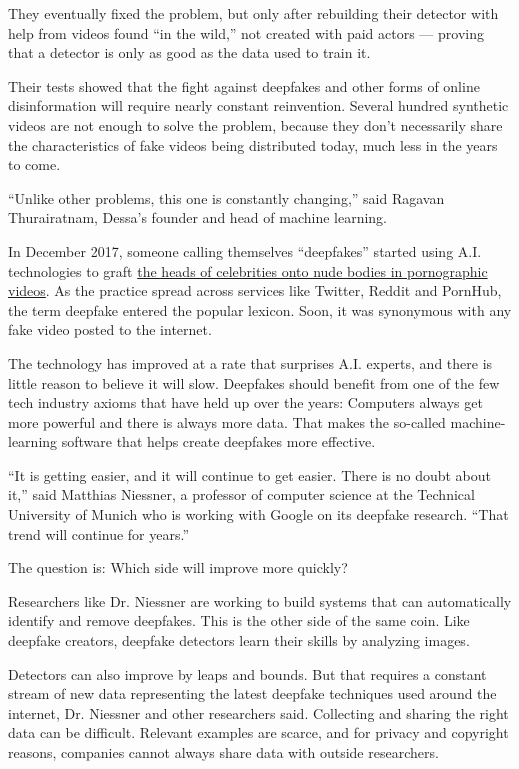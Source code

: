 They eventually fixed the problem, but only after rebuilding their
detector with help from videos found ``in the wild,'' not created with
paid actors --- proving that a detector is only as good as the data used
to train it.

Their tests showed that the fight against deepfakes and other forms of
online disinformation will require nearly constant reinvention. Several
hundred synthetic videos are not enough to solve the problem, because
they don't necessarily share the characteristics of fake videos being
distributed today, much less in the years to come.

``Unlike other problems, this one is constantly changing,'' said Ragavan
Thurairatnam, Dessa's founder and head of machine learning.

In December 2017, someone calling themselves ``deepfakes'' started using
A.I. technologies to graft
\href{https://www.nytimes.com/2018/03/04/technology/fake-videos-deepfakes.html}{the
heads of celebrities onto nude bodies in pornographic videos}. As the
practice spread across services like Twitter, Reddit and PornHub, the
term deepfake entered the popular lexicon. Soon, it was synonymous with
any fake video posted to the internet.

The technology has improved at a rate that surprises A.I. experts, and
there is little reason to believe it will slow. Deepfakes should benefit
from one of the few tech industry axioms that have held up over the
years: Computers always get more powerful and there is always more data.
That makes the so-called machine-learning software that helps create
deepfakes more effective.

``It is getting easier, and it will continue to get easier. There is no
doubt about it,'' said Matthias Niessner, a professor of computer
science at the Technical University of Munich who is working with Google
on its deepfake research. ``That trend will continue for years.''

The question is: Which side will improve more quickly?

Researchers like Dr. Niessner are working to build systems that can
automatically identify and remove deepfakes. This is the other side of
the same coin. Like deepfake creators, deepfake detectors learn their
skills by analyzing images.

Detectors can also improve by leaps and bounds. But that requires a
constant stream of new data representing the latest deepfake techniques
used around the internet, Dr. Niessner and other researchers said.
Collecting and sharing the right data can be difficult. Relevant
examples are scarce, and for privacy and copyright reasons, companies
cannot always share data with outside researchers.


